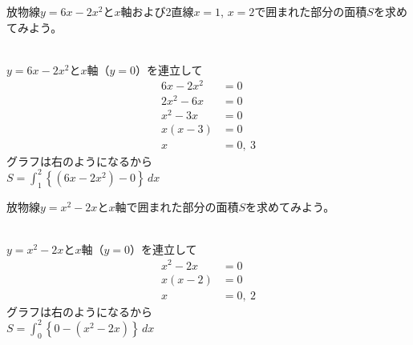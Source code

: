 \begin{multicols*}{4}
 放物線$y=6x-2x^2$と$x$軸および2直線$x=1$, $x=2$で囲まれた部分の面積$S$を求めてみよう。
 \begin{ansBlockSize}{40}
  \\
  $y=6x-2x^2$と$x$軸（$y=0$）を連立して
  \begin{align*}
   6x-2x^2 &= 0\\
   2x^2-6x &= 0\\
   x^2-3x &= 0\\
   x(x-3) &= 0\\
   x &= 0,\ 3
  \end{align*}
  グラフは右のようになるから\\
  $S = \displaystyle\int_{1}^{2}\left\{(6x-2x^2)-0\right\}\,dx$
 \end{ansBlockSize}
 
 \columnbreak{}
 
 放物線$y=x^2-2x$と$x$軸で囲まれた部分の面積$S$を求めてみよう。
 \begin{ansBlockSize}{60}
  \\
  $y=x^2-2x$と$x$軸（$y=0$）を連立して
  \begin{align*}
   x^2-2x &= 0\\
   x(x-2) &= 0\\
   x &= 0,\ 2
  \end{align*}
  グラフは右のようになるから\\
  $S = \displaystyle\int_{0}^{2}\left\{0-(x^2-2x)\right\}\,dx$
 \end{ansBlockSize}
 \vfill
 \null
 
 \columnbreak{}
 

\end{multicols*}
